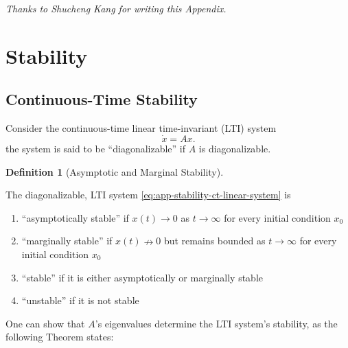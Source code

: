 \documentclass[
]{book}
\theoremstyle{definition}
\newtheorem{definition}{Definition}[chapter]
\theoremstyle{definition}
\theoremstyle{definition}
\theoremstyle{definition}
\theoremstyle{remark}
\begin{document}
\emph{Thanks to Shucheng Kang for writing this Appendix.}

\hypertarget{app-lti-stability}{%
\section{Stability}\label{app-lti-stability}}

\hypertarget{app-lti-stability-ct}{%
\subsection{Continuous-Time Stability}\label{app-lti-stability-ct}}

Consider the continuous-time linear time-invariant (LTI) system
\begin{equation}
\dot{x} = A x.
\label{eq:app-stability-ct-linear-system}
\end{equation}
the system is said to be ``diagonalizable'' if \(A\) is diagonalizable.

\begin{definition}[Asymptotic and Marginal Stability]
\protect\hypertarget{def:ltistable}{}\label{def:ltistable}

The diagonalizable, LTI system \eqref{eq:app-stability-ct-linear-system} is

\begin{enumerate}
\def\labelenumi{\arabic{enumi}.}
\item
  ``asymptotically stable'' if \(x(t) \rightarrow 0\) as \(t \rightarrow \infty\) for every initial condition \(x_0\)
\item
  ``marginally stable'' if \(x(t) \nrightarrow 0\) but remains bounded as \(t \rightarrow \infty\) for every initial condition \(x_0\)
\item
  ``stable'' if it is either asymptotically or marginally stable
\item
  ``unstable'' if it is not stable
\end{enumerate}

\end{definition}

One can show that \(A\)'s eigenvalues determine the LTI system's stability, as the following Theorem states:
\end{document}
